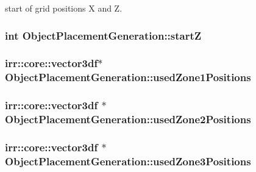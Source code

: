 start of grid positions X and Z. 

\hypertarget{class_object_placement_generation_aa0632a6f68c075e03d6a8c6551f53e4c}{
\subsubsection[{start\-Z}]{\setlength{\rightskip}{0pt plus 5cm}int Object\-Placement\-Generation\-::start\-Z\hspace{0.3cm}{\ttfamily [private]}}}\label{class_object_placement_generation_aa0632a6f68c075e03d6a8c6551f53e4c}
\hypertarget{class_object_placement_generation_a118140096bceaa4572e47a633f368cbb}{
\subsubsection[{used\-Zone1\-Positions}]{\setlength{\rightskip}{0pt plus 5cm}irr\-::core\-::vector3df$\ast$ Object\-Placement\-Generation\-::used\-Zone1\-Positions\hspace{0.3cm}{\ttfamily [private]}}}\label{class_object_placement_generation_a118140096bceaa4572e47a633f368cbb}
\hypertarget{class_object_placement_generation_af25fcc65ed1f622b7afcb661fc1e0323}{
\subsubsection[{used\-Zone2\-Positions}]{\setlength{\rightskip}{0pt plus 5cm}irr\-::core\-::vector3df $\ast$ Object\-Placement\-Generation\-::used\-Zone2\-Positions\hspace{0.3cm}{\ttfamily [private]}}}\label{class_object_placement_generation_af25fcc65ed1f622b7afcb661fc1e0323}
\hypertarget{class_object_placement_generation_ac5e3492f2ca5eccaa63d0d5738f49bf6}{
\subsubsection[{used\-Zone3\-Positions}]{\setlength{\rightskip}{0pt plus 5cm}irr\-::core\-::vector3df $\ast$ Object\-Placement\-Generation\-::used\-Zone3\-Positions\hspace{0.3cm}{\ttfamily [private]}}}\label{class_object_placement_generation_ac5e3492f2ca5eccaa63d0d5738f49bf6}
